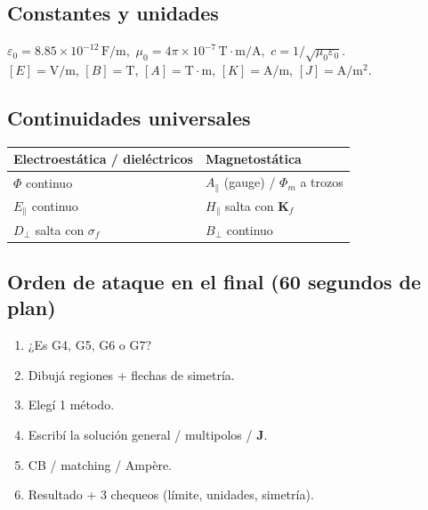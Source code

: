 \documentclass[10pt,a4paper]{article}
\newcommand{\vect}[1]{\mathbf{#1}}
\newcommand{\epso}{\varepsilon_0}
\newcommand{\muo}{\mu_0}
\begin{document}
\subsection{Constantes y unidades}
$\epso=8.85\times 10^{-12}\,\mathrm{F/m}$,\ 
$\muo=4\pi\times 10^{-7}\,\mathrm{T\cdot m/A}$,\ 
$c=1/\sqrt{\muo\epso}$.\\
$[E]=\mathrm{V/m}$, $[B]=\mathrm{T}$, $[A]=\mathrm{T\cdot m}$, $[K]=\mathrm{A/m}$, $[J]=\mathrm{A/m^2}$.

\subsection{Continuidades universales}
\begin{center}
\begin{tabular}{@{}ll@{}}
\toprule
Electroestática / dieléctricos & Magnetostática\\
\midrule
$\Phi$ continuo & $A_\parallel$ (gauge) / $\Phi_m$ a trozos\\
$E_\parallel$ continuo & $H_\parallel$ salta con $\vect{K}_f$\\
$D_\perp$ salta con $\sigma_f$ & $B_\perp$ continuo\\
\bottomrule
\end{tabular}
\end{center}

\subsection{Orden de ataque en el final (60 segundos de plan)}
\begin{enumerate}
\item ¿Es G4, G5, G6 o G7?
\item Dibujá regiones + flechas de simetría.
\item Elegí 1 método.
\item Escribí la solución general / multipolos / $\vect{J}$.
\item CB / matching / Ampère.
\item Resultado + 3 chequeos (límite, unidades, simetría).
\end{enumerate}
\end{document}
